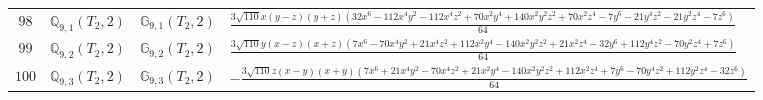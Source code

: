 \documentclass[fleqn,8pt,landscape]{jsarticle}
\begin{document}
\begin{table}[ht!]
\begin{center}
\begin{tabular}{cccl}
$ 98 $ & $ \mathbb{Q}_{9,1}(T_{2},2) $ & $ \mathbb{G}_{9,1}(T_{2},2) $ & $ \frac{3 \sqrt{110} x \left(y - z\right) \left(y + z\right) \left(32 x^{6} - 112 x^{4} y^{2} - 112 x^{4} z^{2} + 70 x^{2} y^{4} + 140 x^{2} y^{2} z^{2} + 70 x^{2} z^{4} - 7 y^{6} - 21 y^{4} z^{2} - 21 y^{2} z^{4} - 7 z^{6}\right)}{64} $ \\
$ 99 $ & $ \mathbb{Q}_{9,2}(T_{2},2) $ & $ \mathbb{G}_{9,2}(T_{2},2) $ & $ \frac{3 \sqrt{110} y \left(x - z\right) \left(x + z\right) \left(7 x^{6} - 70 x^{4} y^{2} + 21 x^{4} z^{2} + 112 x^{2} y^{4} - 140 x^{2} y^{2} z^{2} + 21 x^{2} z^{4} - 32 y^{6} + 112 y^{4} z^{2} - 70 y^{2} z^{4} + 7 z^{6}\right)}{64} $ \\
$ 100 $ & $ \mathbb{Q}_{9,3}(T_{2},2) $ & $ \mathbb{G}_{9,3}(T_{2},2) $ & $ - \frac{3 \sqrt{110} z \left(x - y\right) \left(x + y\right) \left(7 x^{6} + 21 x^{4} y^{2} - 70 x^{4} z^{2} + 21 x^{2} y^{4} - 140 x^{2} y^{2} z^{2} + 112 x^{2} z^{4} + 7 y^{6} - 70 y^{4} z^{2} + 112 y^{2} z^{4} - 32 z^{6}\right)}{64} $ \\
 \hline \hline
\end{tabular}
\end{center}
\end{table}
\end{document}
